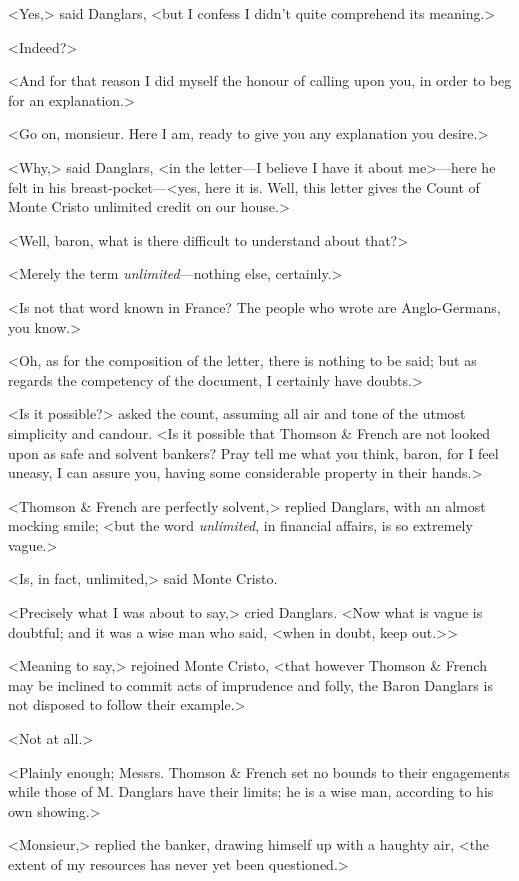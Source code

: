  <Yes,> said Danglars, <but I confess I didn't quite comprehend its meaning.> 

 <Indeed?> 

 <And for that reason I did myself the honour of calling upon you, in order to beg for an explanation.> 

 <Go on, monsieur. Here I am, ready to give you any explanation you desire.> 

 <Why,> said Danglars, <in the letter—I believe I have it about me>—here he felt in his breast-pocket—<yes, here it is. Well, this letter gives the Count of Monte Cristo unlimited credit on our house.> 

 <Well, baron, what is there difficult to understand about that?> 

 <Merely the term \textit{unlimited}—nothing else, certainly.> 

 <Is not that word known in France? The people who wrote are Anglo-Germans, you know.> 

 <Oh, as for the composition of the letter, there is nothing to be said; but as regards the competency of the document, I certainly have doubts.> 

 <Is it possible?> asked the count, assuming all air and tone of the utmost simplicity and candour. <Is it possible that Thomson \& French are not looked upon as safe and solvent bankers? Pray tell me what you think, baron, for I feel uneasy, I can assure you, having some considerable property in their hands.> 

 <Thomson \& French are perfectly solvent,> replied Danglars, with an almost mocking smile; <but the word \textit{unlimited}, in financial affairs, is so extremely vague.> 

 <Is, in fact, unlimited,> said Monte Cristo. 

 <Precisely what I was about to say,> cried Danglars. <Now what is vague is doubtful; and it was a wise man who said, <when in doubt, keep out.>> 

 <Meaning to say,> rejoined Monte Cristo, <that however Thomson \& French may be inclined to commit acts of imprudence and folly, the Baron Danglars is not disposed to follow their example.> 

 <Not at all.> 

 <Plainly enough; Messrs. Thomson \& French set no bounds to their engagements while those of M. Danglars have their limits; he is a wise man, according to his own showing.> 

 <Monsieur,> replied the banker, drawing himself up with a haughty air, <the extent of my resources has never yet been questioned.> 

